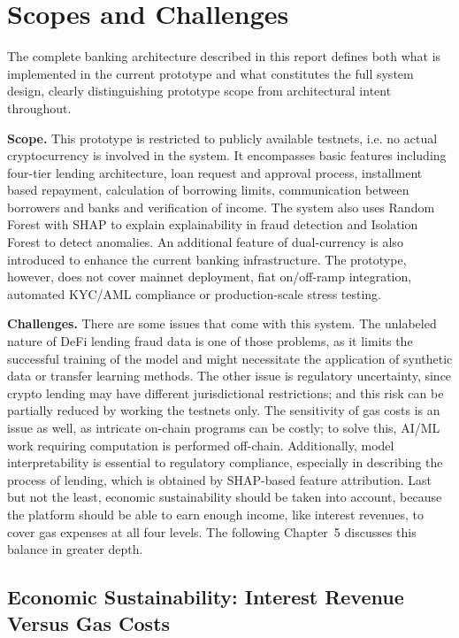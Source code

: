 \documentclass[12pt,a4paper]{report}
\begin{document}
\section{Scopes and Challenges}

\noindent The complete banking architecture described in this report defines both what is implemented in the current prototype and what constitutes the full system design, clearly distinguishing prototype scope from architectural intent throughout.

\textbf{Scope.} This prototype is restricted to publicly available testnets, i.e. no actual cryptocurrency is involved in the system. It encompasses basic features including four-tier lending architecture, loan request and approval process, installment based repayment, calculation of borrowing limits, communication between borrowers and banks and verification of income. The system also uses Random Forest with SHAP to explain explainability in fraud detection and Isolation Forest to detect anomalies. An additional feature of dual-currency is also introduced to enhance the current banking infrastructure. The prototype, however, does not cover mainnet deployment, fiat on/off-ramp integration, automated KYC/AML compliance or production-scale stress testing.

\textbf{Challenges.} There are some issues that come with this system. The unlabeled nature of DeFi lending fraud data is one of those problems, as it limits the successful training of the model and might necessitate the application of synthetic data or transfer learning methods. The other issue is regulatory uncertainty, since crypto lending may have different jurisdictional restrictions; and this risk can be partially reduced by working the testnets only. The sensitivity of gas costs is an issue as well, as intricate on-chain programs can be costly; to solve this, AI/ML work requiring computation is performed off-chain. Additionally, model interpretability is essential to regulatory compliance, especially in describing the process of lending, which is obtained by SHAP-based feature attribution. Last but not the least, economic sustainability should be taken into account, because the platform should be able to earn enough income, like interest revenues, to cover gas expenses at all four levels. The following Chapter~5 discusses this balance in greater depth.

\subsection{Economic Sustainability: Interest Revenue Versus Gas Costs}
\end{document}
